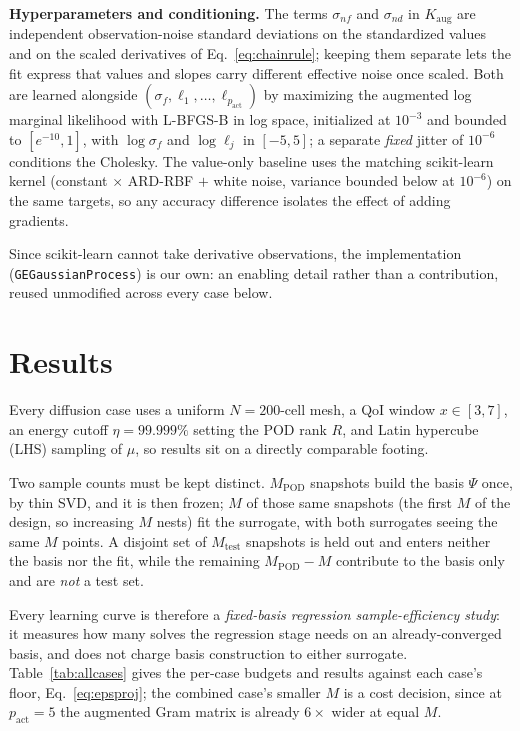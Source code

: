 \documentclass[]{ANStopical}
\begin{document}
\textbf{Hyperparameters and conditioning.} The terms $\sigma_{nf}$ and $\sigma_{nd}$ in $K_{\mathrm{aug}}$ are independent observation-noise standard deviations on the standardized values and on the scaled derivatives of Eq.~\eqref{eq:chainrule}; keeping them separate lets the fit express that values and slopes carry different effective noise once scaled. Both are learned alongside $(\sigma_f,\ell_1,\dots,\ell_{p_{\mathrm{act}}})$ by maximizing the augmented log marginal likelihood with L-BFGS-B in log space, initialized at $10^{-3}$ and bounded to $[e^{-10},1]$, with $\log\sigma_f$ and $\log\ell_j$ in $[-5,5]$; a separate \emph{fixed} jitter of $10^{-6}$ conditions the Cholesky. The value-only baseline uses the matching scikit-learn kernel (constant $\times$ ARD-RBF $+$ white noise, variance bounded below at $10^{-6}$) on the same targets, so any accuracy difference isolates the effect of adding gradients.

Since scikit-learn cannot take derivative observations, the implementation (\texttt{GEGaussianProcess}) is our own: an enabling detail rather than a contribution, reused unmodified across every case below.

\section{Results}\label{sec:results}

Every diffusion case uses a uniform $N=200$-cell mesh, a QoI window $x\in[3,7]$, an energy cutoff $\eta=99.999\%$ setting the POD rank $R$, and Latin hypercube (LHS) sampling of $\mu$, so results sit on a directly comparable footing.

Two sample counts must be kept distinct. $M_{\mathrm{POD}}$ snapshots build the basis $\Psi$ once, by thin SVD, and it is then frozen; $M$ of those same snapshots (the first $M$ of the design, so increasing $M$ nests) fit the surrogate, with both surrogates seeing the same $M$ points. A disjoint set of $M_{\mathrm{test}}$ snapshots is held out and enters neither the basis nor the fit, while the remaining $M_{\mathrm{POD}}-M$ contribute to the basis only and are \emph{not} a test set.

Every learning curve is therefore a \emph{fixed-basis regression sample-efficiency study}: it measures how many solves the regression stage needs on an already-converged basis, and does not charge basis construction to either surrogate. Table~\ref{tab:allcases} gives the per-case budgets and results against each case's floor, Eq.~\eqref{eq:epsproj}; the combined case's smaller $M$ is a cost decision, since at $p_{\mathrm{act}}=5$ the augmented Gram matrix is already $6\times$ wider at equal $M$.
\end{document}
